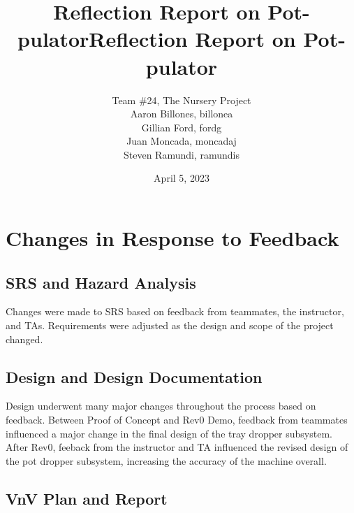 \documentclass{article}
\title{Reflection Report on Pot-pulator}
\title{Reflection Report on Pot-pulator}
\author{Team \#24, The Nursery Project\\Aaron Billones, billonea\\Gillian Ford, fordg\\Juan Moncada, moncadaj\\Steven Ramundi, ramundis}
\date{April 5, 2023}
\begin{document}
\maketitle


\section{Changes in Response to Feedback}



\subsection{SRS and Hazard Analysis}

Changes were made to SRS based on feedback from teammates, the instructor, and TAs. 
Requirements were adjusted as the design and scope of the project changed.

\subsection{Design and Design Documentation}

Design underwent many major changes throughout the process based on feedback. Between Proof of Concept 
and Rev0 Demo, feedback from teammates influenced a major change in the final design of the tray dropper 
subsystem. After Rev0, feeback from the instructor and TA influenced the revised design of the pot dropper 
subsystem, increasing the accuracy of the machine overall.

\subsection{VnV Plan and Report}
\end{document}
